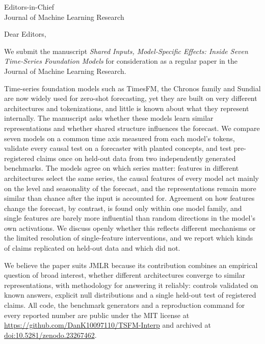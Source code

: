 \documentclass[11pt]{letter}
\date{October 25, 2026}
\begin{document}
\begin{letter}{Editors-in-Chief\\
Journal of Machine Learning Research}

\opening{Dear Editors,}

We submit the manuscript \emph{Shared Inputs, Model-Specific Effects: Inside Seven Time-Series Foundation Models} for consideration as a regular paper in the Journal of Machine Learning Research.

Time-series foundation models such as TimesFM, the Chronos family and Sundial are now widely used for zero-shot forecasting, yet they are built on very different architectures and tokenizations, and little is known about what they represent internally.
The manuscript asks whether these models learn similar representations and whether shared structure influences the forecast.
We compare seven models on a common time axis measured from each model's tokens, validate every causal test on a forecaster with planted concepts, and test pre-registered claims once on held-out data from two independently generated benchmarks.
The models agree on which series matter: features in different architectures select the same series, the causal features of every model act mainly on the level and seasonality of the forecast, and the representations remain more similar than chance after the input is accounted for.
Agreement on how features change the forecast, by contrast, is found only within one model family, and single features are barely more influential than random directions in the model's own activations.
We discuss openly whether this reflects different mechanisms or the limited resolution of single-feature interventions, and we report which kinds of claims replicated on held-out data and which did not.

We believe the paper suits JMLR because its contribution combines an empirical question of broad interest, whether different architectures converge to similar representations, with methodology for answering it reliably: controls validated on known answers, explicit null distributions and a single held-out test of registered claims.
All code, the benchmark generators and a reproduction command for every reported number are public under the MIT license at \url{https://github.com/DanK10097110/TSFM-Interp} and archived at \href{https://doi.org/10.5281/zenodo.23267462}{doi:10.5281/zenodo.23267462}.


\end{letter}
\end{document}
